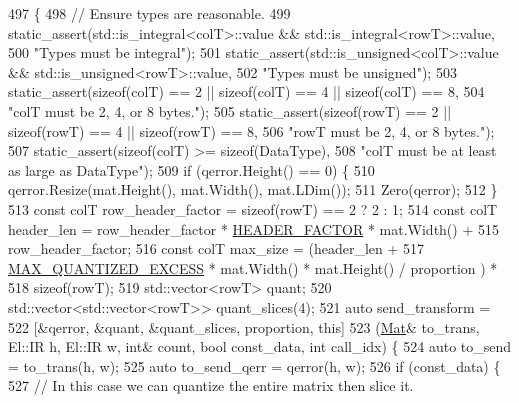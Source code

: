 \begin{DoxyCode}
497                                                            \{
498   \textcolor{comment}{// Ensure types are reasonable.}
499   static\_assert(std::is\_integral<colT>::value && std::is\_integral<rowT>::value,
500                 \textcolor{stringliteral}{"Types must be integral"});
501   static\_assert(std::is\_unsigned<colT>::value && std::is\_unsigned<rowT>::value,
502                 \textcolor{stringliteral}{"Types must be unsigned"});
503   static\_assert(\textcolor{keyword}{sizeof}(colT) == 2 || \textcolor{keyword}{sizeof}(colT) == 4 || \textcolor{keyword}{sizeof}(colT) == 8,
504                 \textcolor{stringliteral}{"colT must be 2, 4, or 8 bytes."});
505   static\_assert(\textcolor{keyword}{sizeof}(rowT) == 2 || \textcolor{keyword}{sizeof}(rowT) == 4 || \textcolor{keyword}{sizeof}(rowT) == 8,
506                 \textcolor{stringliteral}{"rowT must be 2, 4, or 8 bytes."});
507   static\_assert(\textcolor{keyword}{sizeof}(colT) >= \textcolor{keyword}{sizeof}(DataType),
508                 \textcolor{stringliteral}{"colT must be at least as large as DataType"});
509   \textcolor{keywordflow}{if} (qerror.Height() == 0) \{
510     qerror.Resize(mat.Height(), mat.Width(), mat.LDim());
511     Zero(qerror);
512   \}
513   \textcolor{keyword}{const} colT row\_header\_factor = \textcolor{keyword}{sizeof}(rowT) == 2 ? 2 : 1;
514   \textcolor{keyword}{const} colT header\_len = row\_header\_factor * \hyperlink{classlbann_1_1lbann__quantizer_afb4315625e371169cabfac56c3f75d37}{HEADER\_FACTOR} * mat.Width() +
515                           row\_header\_factor;
516   \textcolor{keyword}{const} colT max\_size = (header\_len +
517                          \hyperlink{classlbann_1_1lbann__quantizer_abe63d57e62be1b498848f7920de4433a}{MAX\_QUANTIZED\_EXCESS} * mat.Width() * mat.Height() / proportion
      ) *
518                          \textcolor{keyword}{sizeof}(rowT);
519   std::vector<rowT> quant;
520   std::vector<std::vector<rowT>> quant\_slices(4);
521   \textcolor{keyword}{auto} send\_transform =
522     [&qerror, &quant, &quant\_slices, proportion, \textcolor{keyword}{this}]
523   (\hyperlink{base_8hpp_a68f11fdc31b62516cb310831bbe54d73}{Mat}& to\_trans, El::IR h, El::IR w, \textcolor{keywordtype}{int}& count, \textcolor{keywordtype}{bool} const\_data, \textcolor{keywordtype}{int} call\_idx) \{
524     \textcolor{keyword}{auto} to\_send = to\_trans(h, w);
525     \textcolor{keyword}{auto} to\_send\_qerr = qerror(h, w);
526     \textcolor{keywordflow}{if} (const\_data) \{
527       \textcolor{comment}{// In this case we can quantize the entire matrix then slice it.}

\end{DoxyCode}

